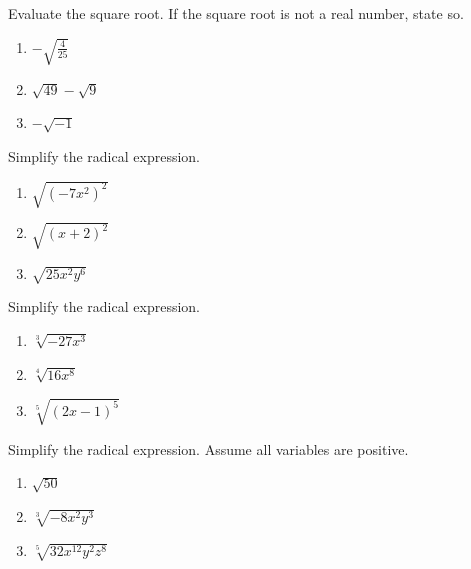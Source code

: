 \documentclass[
  en,11pt]{elegantbook}
\let\BeginKnitrBlock\begin \let\EndKnitrBlock\end
\begin{document}
\BeginKnitrBlock{exercise}
\protect\hypertarget{exr:unnamed-chunk-86}{}{\label{exr:unnamed-chunk-86} }
Evaluate the square root. If the square root is not a real number, state so.

\begin{enumerate}
\def\labelenumi{\arabic{enumi}.}

\item
  \(-\sqrt{\frac{4}{25}}\)
\item
  \(\sqrt{49}-\sqrt{9}\)
\item
  \(-\sqrt{-1}\)\null
\end{enumerate}
\EndKnitrBlock{exercise}

\BeginKnitrBlock{exercise}
\protect\hypertarget{exr:unnamed-chunk-87}{}{\label{exr:unnamed-chunk-87} }
Simplify the radical expression.

\begin{enumerate}
\def\labelenumi{\arabic{enumi}.}

\item
  \(\sqrt{(-7x^2)^2}\)
\item
  \(\sqrt{(x+2)^2}\)
\item
  \(\sqrt{25x^2y^6}\)
\end{enumerate}
\EndKnitrBlock{exercise}

\BeginKnitrBlock{exercise}
\protect\hypertarget{exr:unnamed-chunk-88}{}{\label{exr:unnamed-chunk-88} }
Simplify the radical expression.

\begin{enumerate}
\def\labelenumi{\arabic{enumi}.}

\item
  \(\sqrt[3]{-27x^3}\)
\item
  \(\sqrt[4]{16x^8}\)
\item
  \(\sqrt[5]{(2x-1)^5}\)
\end{enumerate}
\EndKnitrBlock{exercise}

\BeginKnitrBlock{exercise}
\protect\hypertarget{exr:unnamed-chunk-89}{}{\label{exr:unnamed-chunk-89} }
Simplify the radical expression. Assume all variables are positive.

\begin{enumerate}
\def\labelenumi{\arabic{enumi}.}

\item
  \(\sqrt{50}\)
\item
  \(\sqrt[3]{-8x^2y^3}\)
\item
  \(\sqrt[5]{32x^{12}y^2z^8}\)
\end{enumerate}
\EndKnitrBlock{exercise}
\end{document}
